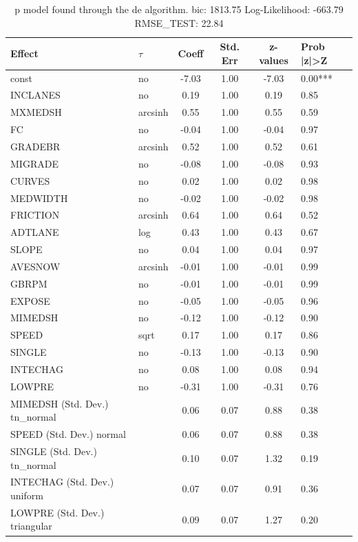 \begin{table}
	\caption{p model found through the de algorithm. bic: 1813.75 Log-Likelihood: -663.79 RMSE_TEST: 22.84}
	\begin{center}
		\begin{tabular}{|l|l|c|c|c|l|}
			\hline
			Effect & $\tau$ & Coeff & Std. Err & z-values & Prob |z|>Z \\
			\hline
			const & no & -7.03 & 1.00 & -7.03 & 0.00*** \\
			\hline
			INCLANES & no & 0.19 & 1.00 & 0.19 & 0.85 \\
			\hline
			MXMEDSH & arcsinh & 0.55 & 1.00 & 0.55 & 0.59 \\
			\hline
			FC & no & -0.04 & 1.00 & -0.04 & 0.97 \\
			\hline
			GRADEBR & arcsinh & 0.52 & 1.00 & 0.52 & 0.61 \\
			\hline
			MIGRADE & no & -0.08 & 1.00 & -0.08 & 0.93 \\
			\hline
			CURVES & no & 0.02 & 1.00 & 0.02 & 0.98 \\
			\hline
			MEDWIDTH & no & -0.02 & 1.00 & -0.02 & 0.98 \\
			\hline
			FRICTION & arcsinh & 0.64 & 1.00 & 0.64 & 0.52 \\
			\hline
			ADTLANE & log & 0.43 & 1.00 & 0.43 & 0.67 \\
			\hline
			SLOPE & no & 0.04 & 1.00 & 0.04 & 0.97 \\
			\hline
			AVESNOW & arcsinh & -0.01 & 1.00 & -0.01 & 0.99 \\
			\hline
			GBRPM & no & -0.01 & 1.00 & -0.01 & 0.99 \\
			\hline
			EXPOSE & no & -0.05 & 1.00 & -0.05 & 0.96 \\
			\hline
			MIMEDSH & no & -0.12 & 1.00 & -0.12 & 0.90 \\
			\hline
			SPEED & sqrt & 0.17 & 1.00 & 0.17 & 0.86 \\
			\hline
			SINGLE & no & -0.13 & 1.00 & -0.13 & 0.90 \\
			\hline
			INTECHAG & no & 0.08 & 1.00 & 0.08 & 0.94 \\
			\hline
			LOWPRE & no & -0.31 & 1.00 & -0.31 & 0.76 \\
			\hline
			MIMEDSH (Std. Dev.) tn_normal &  & 0.06 & 0.07 & 0.88 & 0.38 \\
			\hline
			SPEED (Std. Dev.) normal &  & 0.06 & 0.07 & 0.88 & 0.38 \\
			\hline
			SINGLE (Std. Dev.) tn_normal &  & 0.10 & 0.07 & 1.32 & 0.19 \\
			\hline
			INTECHAG (Std. Dev.) uniform &  & 0.07 & 0.07 & 0.91 & 0.36 \\
			\hline
			LOWPRE (Std. Dev.) triangular &  & 0.09 & 0.07 & 1.27 & 0.20 \\
			\hline
		\end{tabular}
	\end{center}
\end{table}